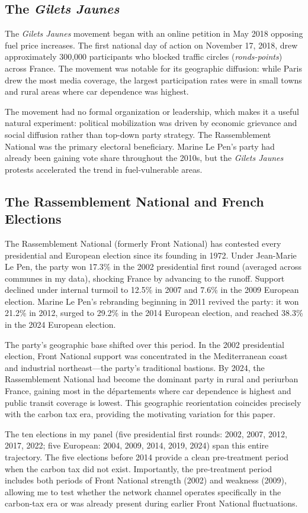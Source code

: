 \documentclass[12pt]{article}
\newcommand{\rn}{Rassemblement National}
\newcommand{\fn}{Front National}
\newcommand{\gj}{\textit{Gilets Jaunes}}
\newcommand{\depts}{d\'{e}partements}
\begin{document}
\subsection{The \textit{Gilets Jaunes}}

The \gj{} movement began with an online petition in May 2018 opposing fuel price increases. The first national day of action on November 17, 2018, drew approximately 300,000 participants who blocked traffic circles (\textit{ronds-points}) across France. The movement was notable for its geographic diffusion: while Paris drew the most media coverage, the largest participation rates were in small towns and rural areas where car dependence was highest.

The movement had no formal organization or leadership, which makes it a useful natural experiment: political mobilization was driven by economic grievance and social diffusion rather than top-down party strategy. The \rn{} was the primary electoral beneficiary. Marine Le Pen's party had already been gaining vote share throughout the 2010s, but the \gj{} protests accelerated the trend in fuel-vulnerable areas.

\subsection{The \rn{} and French Elections}

The \rn{} (formerly \fn{}) has contested every presidential and European election since its founding in 1972. Under Jean-Marie Le Pen, the party won 17.3\% in the 2002 presidential first round (averaged across communes in my data), shocking France by advancing to the runoff. Support declined under internal turmoil to 12.5\% in 2007 and 7.6\% in the 2009 European election. Marine Le Pen's rebranding beginning in 2011 revived the party: it won 21.2\% in 2012, surged to 29.2\% in the 2014 European election, and reached 38.3\% in the 2024 European election.

The party's geographic base shifted over this period. In the 2002 presidential election, \fn{} support was concentrated in the Mediterranean coast and industrial northeast---the party's traditional bastions. By 2024, the \rn{} had become the dominant party in rural and periurban France, gaining most in the \depts{} where car dependence is highest and public transit coverage is lowest. This geographic reorientation coincides precisely with the carbon tax era, providing the motivating variation for this paper.

The ten elections in my panel (five presidential first rounds: 2002, 2007, 2012, 2017, 2022; five European: 2004, 2009, 2014, 2019, 2024) span this entire trajectory. The five elections before 2014 provide a clean pre-treatment period when the carbon tax did not exist. Importantly, the pre-treatment period includes both periods of \fn{} strength (2002) and weakness (2009), allowing me to test whether the network channel operates specifically in the carbon-tax era or was already present during earlier \fn{} fluctuations.
\end{document}
